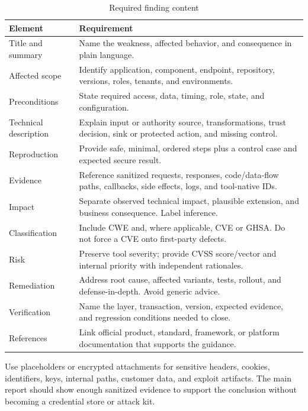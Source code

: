 \documentclass[11pt,letterpaper]{article}
\begin{document}
\begin{table}[H]
\centering
\caption{Required finding content}
\small
\begin{tabularx}{\textwidth}{@{}L{1.6in}Y@{}}
\toprule
\textbf{Element} & \textbf{Requirement} \\
\midrule
Title and summary & Name the weakness, affected behavior, and consequence in plain language. \\
Affected scope & Identify application, component, endpoint, repository, versions, roles, tenants, and environments. \\
Preconditions & State required access, data, timing, role, state, and configuration. \\
Technical description & Explain input or authority source, transformations, trust decision, sink or protected action, and missing control. \\
Reproduction & Provide safe, minimal, ordered steps plus a control case and expected secure result. \\
Evidence & Reference sanitized requests, responses, code/data-flow paths, callbacks, side effects, logs, and tool-native IDs. \\
Impact & Separate observed technical impact, plausible extension, and business consequence. Label inference. \\
Classification & Include CWE and, where applicable, CVE or GHSA. Do not force a CVE onto first-party defects. \\
Risk & Preserve tool severity; provide CVSS score/vector and internal priority with independent rationales. \\
Remediation & Address root cause, affected variants, tests, rollout, and defense-in-depth. Avoid generic advice. \\
Verification & Name the layer, transaction, version, expected evidence, and regression conditions needed to close. \\
References & Link official product, standard, framework, or platform documentation that supports the guidance. \\
\bottomrule
\end{tabularx}
\end{table}

Use placeholders or encrypted attachments for sensitive headers, cookies, identifiers, keys, internal paths, customer data, and exploit artifacts. The main report should show enough sanitized evidence to support the conclusion without becoming a credential store or attack kit.
\end{document}
